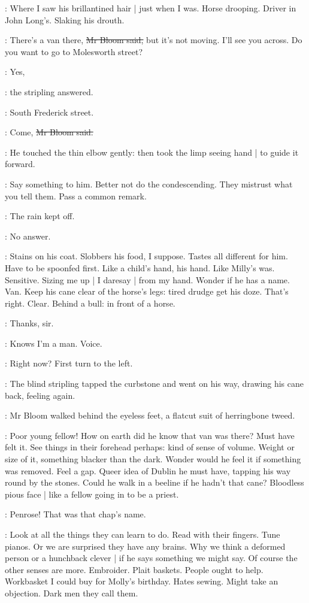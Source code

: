 \BloomInt:
Where I saw his brillantined hair |
just when I was.
Horse drooping.
Driver in John Long's.
Slaking his drouth.

\Bloom:
There's a van there,
\sout{Mr Bloom said,}
but it's not moving.
I'll see you across.
Do you want to go to Molesworth street?

\stripling:
Yes,

:
the stripling answered.

\stripling:
South Frederick street.

\Bloom:
Come,
\sout{Mr Bloom said.}

:
He touched the thin elbow gently:
then took the limp seeing hand |
to guide it forward.

\BloomInt:
Say something to him.
Better not do the condescending.
They mistrust what you tell them.
Pass a common remark.

\Bloom:
The rain kept off.

\BloomInt:
No answer.

\BloomInt:
Stains on his coat.
Slobbers his food, I suppose.
Tastes all different for him.
Have to be spoonfed first.
Like a child's hand, his hand.
Like Milly's was.
Sensitive.
Sizing me up |
I daresay |
from my hand.
Wonder if he has a name.
Van.
Keep his cane clear of the horse's legs:
tired drudge get his doze.
That's right.
Clear.
Behind a bull:
in front of a horse.

\stripling:
Thanks, sir.

\BloomInt:
Knows I'm a man.
Voice.

\Bloom:
Right now?
First turn to the left.

:
The blind stripling tapped the curbstone and went on his way,
drawing his cane back,
feeling again.

:
Mr Bloom walked behind the eyeless feet,
a flatcut suit of herringbone tweed.

\BloomInt:
Poor young fellow!
How on earth did he know that van was there?
Must have felt it.
See things in their forehead perhaps:
kind of sense of volume.
Weight or size of it,
something blacker than the dark.
Wonder would he feel it
if something was removed.
Feel a gap.
Queer idea of Dublin he must have,
tapping his way round by the stones.
Could he walk in a beeline
if he hadn't that cane?
Bloodless pious face |
like a fellow going in to be a priest.

\BloomInt:
Penrose!
That was that chap's name.

\BloomInt:
Look at all the things they can learn to do.
Read with their fingers.
Tune pianos.
Or we are surprised they have any brains.
Why we think a deformed person or a hunchback clever |
if he says something we might say.
Of course the other senses are more.
Embroider.
Plait baskets.
People ought to help.
Workbasket I could buy for Molly's birthday.
Hates sewing.
Might take an objection.
Dark men they call them.

